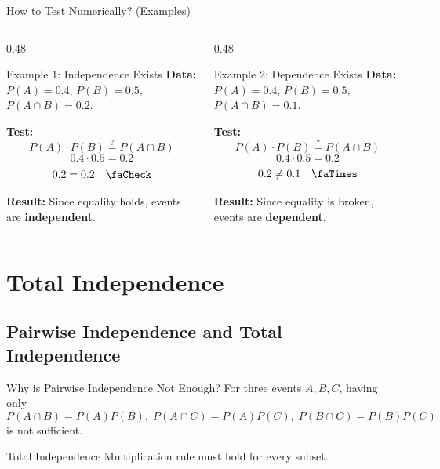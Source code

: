 \documentclass[light]{lutbeamer}
\begin{document}
\begin{frame}{How to Test Numerically? (Examples)}
    \begin{columns}[T]
        \begin{column}{0.48\textwidth}
            \begin{exampleblock}{Example 1: Independence Exists}
                \small
                \textbf{Data:} $P(A)=0.4$, $P(B)=0.5$, $P(A \cap B)=0.2$.
                
                \textbf{Test:}
                \[ P(A) \cdot P(B) \stackrel{?}{=} P(A \cap B) \]
                \[ 0.4 \cdot 0.5 = 0.2 \]
                \[ 0.2 = 0.2 \quad \text{\faCheck} \]
                
                \textbf{Result:} Since equality holds, events are \textbf{independent}.
            \end{exampleblock}
        \end{column}
        \begin{column}{0.48\textwidth}
            \begin{alertblock}{Example 2: Dependence Exists}
                \small
                \textbf{Data:} $P(A)=0.4$, $P(B)=0.5$, $P(A \cap B)=0.1$.
                
                \textbf{Test:}
                \[ P(A) \cdot P(B) \stackrel{?}{=} P(A \cap B) \]
                \[ 0.4 \cdot 0.5 = 0.2 \]
                \[ 0.2 \neq 0.1 \quad \text{\faTimes} \]
                
                \textbf{Result:} Since equality is broken, events are \textbf{dependent}.
            \end{alertblock}
        \end{column}
    \end{columns}
\end{frame}

\section{Total Independence}
\subsection{Pairwise Independence and Total Independence}

\begin{frame}{Why is Pairwise Independence Not Enough?}
    For three events \(A,B,C\), having only
    \[
    P(A\cap B)=P(A)P(B),\;
    P(A\cap C)=P(A)P(C),\;
    P(B\cap C)=P(B)P(C)
    \]
    is not sufficient.

    \begin{block}{Total Independence}
        Multiplication rule must hold for every subset.
    \end{block}
\end{frame}
\end{document}
